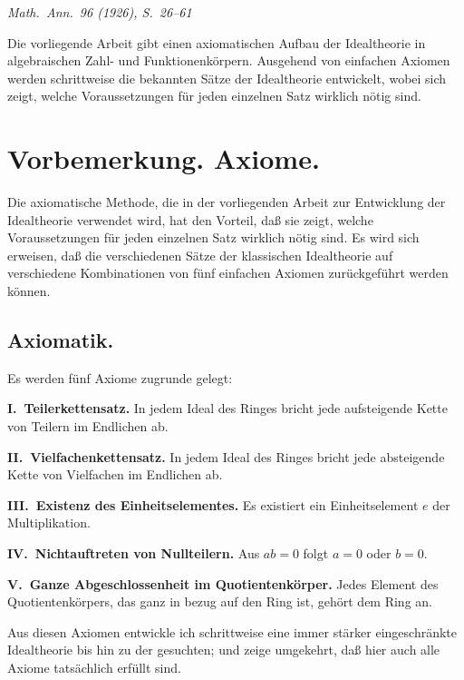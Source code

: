 \documentclass[12pt,a4paper]{article}
\theoremstyle{plain}
\theoremstyle{definition}
\theoremstyle{remark}
\begin{document}
\begin{center}
\textit{Math.\ Ann.\ 96 (1926), S.~26--61}
\end{center}

\vspace{0.5cm}

\noindent
Die vorliegende Arbeit gibt einen axiomatischen Aufbau der Idealtheorie in algebraischen Zahl- und Funktionenkörpern. Ausgehend von einfachen Axiomen werden schrittweise die bekannten Sätze der Idealtheorie entwickelt, wobei sich zeigt, welche Voraussetzungen für jeden einzelnen Satz wirklich nötig sind.

\setcounter{section}{0}
\setcounter{Satz}{0}

\section{Vorbemerkung. Axiome.}

\noindent
Die axiomatische Methode, die in der vorliegenden Arbeit zur Entwicklung der Idealtheorie verwendet wird, hat den Vorteil, daß sie zeigt, welche Voraussetzungen für jeden einzelnen Satz wirklich nötig sind. Es wird sich erweisen, daß die verschiedenen Sätze der klassischen Idealtheorie auf verschiedene Kombinationen von fünf einfachen Axiomen zurückgeführt werden können.

\subsection*{Axiomatik.}

\noindent
Es werden fünf Axiome zugrunde gelegt:

\medskip
\noindent
\textbf{I.~Teilerkettensatz.} In jedem Ideal des Ringes bricht jede aufsteigende Kette von Teilern im Endlichen ab.

\medskip
\noindent
\textbf{II.~Vielfachenkettensatz.} In jedem Ideal des Ringes bricht jede absteigende Kette von Vielfachen im Endlichen ab.

\medskip
\noindent
\textbf{III.~Existenz des Einheitselementes.} Es existiert ein Einheitselement $e$ der Multiplikation.

\medskip
\noindent
\textbf{IV.~Nichtauftreten von Nullteilern.} Aus $ab = 0$ folgt $a = 0$ oder $b = 0$.

\medskip
\noindent
\textbf{V.~Ganze Abgeschlossenheit im Quotientenkörper.} Jedes Element des Quotientenkörpers, das ganz in bezug auf den Ring ist, gehört dem Ring an.

\medskip
\noindent
Aus diesen Axiomen entwickle ich schrittweise eine immer stärker eingeschränkte Idealtheorie bis hin zu der gesuchten; und zeige umgekehrt, daß hier auch alle Axiome tatsächlich erfüllt sind.
\end{document}
